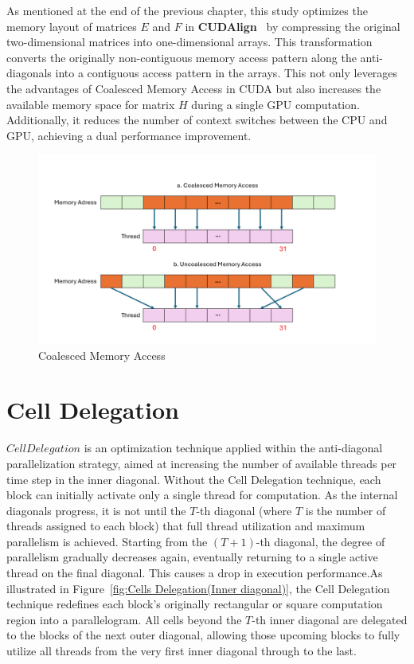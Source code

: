 \documentclass[PhD]{PHlab-thesis}
\begin{document}
As mentioned at the end of the previous chapter, this study optimizes the memory layout of matrices $E$ and $F$ in \textbf{CUDAlign}~\cite{CUDAlign} by compressing the original two-dimensional matrices into one-dimensional arrays. This transformation converts the originally non-contiguous memory access pattern along the anti-diagonals into a contiguous access pattern in the arrays. This not only leverages the advantages of Coalesced Memory Access in CUDA but also increases the available memory space for matrix $H$ during a single GPU computation. Additionally, it reduces the number of context switches between the CPU and GPU, achieving a dual performance improvement.

\begin{figure}[ht]
    \centering
    \includegraphics[width = 1\textwidth]{figures/Coalesced Memory Access.png}
    \caption{Coalesced Memory Access}
    \label{fig:Coalesced Memory Access}
\end{figure}

\section{Cell Delegation}
$Cell Delegation$ is an optimization technique applied within the anti-diagonal parallelization strategy, aimed at increasing the number of available threads per time step in the inner diagonal. Without the Cell Delegation technique, each block can initially activate only a single thread for computation. As the internal diagonals progress, it is not until the $T$-th diagonal (where $T$ is the number of threads assigned to each block) that full thread utilization and maximum parallelism is achieved. Starting from the $(T+1)$-th diagonal, the degree of parallelism gradually decreases again, eventually returning to a single active thread on the final diagonal. This causes a drop in execution performance.As illustrated in Figure~\ref{fig:Cells Delegation(Inner diagonal)}, the Cell Delegation technique redefines each block’s originally rectangular or square computation region into a parallelogram. All cells beyond the $T$-th inner diagonal are delegated to the blocks of the next outer diagonal, allowing those upcoming blocks to fully utilize all threads from the very first inner diagonal through to the last.
\end{document}
